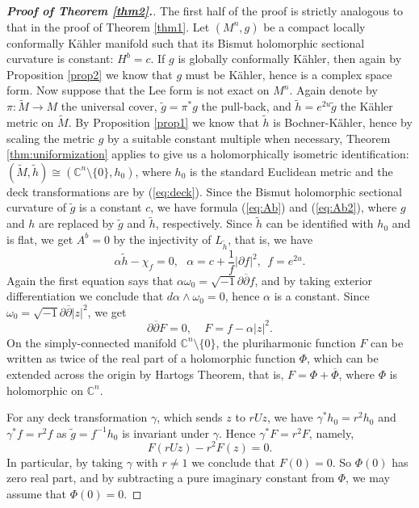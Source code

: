 \documentclass{amsart}
\numberwithin{equation}{section}
\begin{document}
\begin{proof}[{\bf Proof of Theorem \ref{thm2}.}]
The first half of the proof is strictly analogous to that in the proof of Theorem \ref{thm1}. Let $(M^n,g)$ be a compact locally conformally K\"ahler manifold such that its Bismut holomorphic sectional curvature is constant: $H^b=c$. If $g$ is globally conformally K\"ahler, then again by Proposition \ref{prop2} we know that $g$ must be K\"ahler, hence is a complex space form. Now suppose that  the Lee form is not exact on $M^n$. Again denote by $\pi: \widetilde{M} \rightarrow M$ the universal cover, $\widetilde{g}=\pi^{\ast}\!g$ the pull-back, and $\widetilde{h}=e^{2u}\widetilde{g}$ the K\"ahler metric on $\widetilde{M}$. By Proposition \ref{prop1} we know that $\widetilde{h}$ is Bochner-K\"ahler, hence by scaling the metric $g$ by a suitable constant multiple when necessary, Theorem \ref{thm:uniformization} applies to give us a holomorphically isometric identification: $(\widetilde M, \widetilde h)\cong ({\mathbb C}^n\setminus \{ 0\}, h_0)$, where $h_0$ is the standard Euclidean metric and the deck transformations are by (\ref{eq:deck}). Since the Bismut holomorphic sectional curvature of $\widetilde g$ is a constant $c$, we have formula (\ref{eq:Ab}) and (\ref{eq:Ab2}), where $g$ and $h$ are replaced by $\widetilde g$ and $\widetilde h$, respectively. Since $\widetilde h$ can be identified with $h_0$ and is flat, we get $A^b=0$ by the injectivity of $L_{\widetilde{h}}$, that is, we have
$$ \alpha \widetilde h - \chi_f =0, \ \ \ \alpha = c+\frac{1}{f}|\partial f|^2, \ \ f=e^{2u}.$$
Again the first equation says that $\alpha \omega_0 =\sqrt{-1}\partial \overline{\partial}f$, and by taking exterior differentiation we conclude that $d\alpha \wedge \omega_0=0$, hence $\alpha$ is a constant. Since $\omega_0=\sqrt{-1} \partial \overline{\partial} |z|^2$, we get
$$ \partial \overline{\partial} F=0, \ \ \ \ \ F=f-\alpha|z|^2.$$
On the simply-connected manifold ${\mathbb C}^n\setminus \{ 0\}$, the pluriharmonic function $F$ can be written as twice of the real part of a holomorphic function $\Phi$, which can be extended across the origin by Hartogs Theorem, that is,
$F=\Phi + \overline{\Phi}$, where $\Phi$ is holomorphic on ${\mathbb C}^n$.



For any deck transformation $\gamma$, which sends $z$ to $rUz$, we have $\gamma^{\ast}h_0=r^2h_0$ and $\gamma^{\ast}f=r^2f$ as $\widetilde g=f^{-1}h_0$ is invariant under $\gamma$. Hence $\gamma^{\ast}F=r^2F$, namely,
$$ F(rUz)- r^2F(z) = 0. $$
In particular, by taking $\gamma$ with $r\neq 1$ we conclude that $F(0)=0$. So $\Phi (0)$ has zero real part, and by subtracting a pure imaginary constant from $\Phi$, we may assume that $\Phi (0)=0$.


\end{proof}
\end{document}
